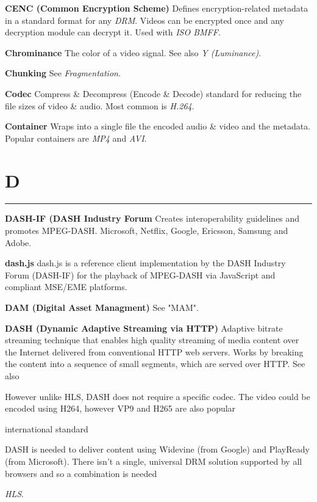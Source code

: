 \smallskip
\textbf{CENC (Common Encryption Scheme)}
Defines encryption-related metadata in a standard format for any \textit{DRM}.  Videos can be encrypted once and any decryption module can decrypt it.  Used with \textit{ISO BMFF}.

\smallskip
\textbf{Chrominance}
The color of a video signal. See also \textit{Y (Luminance)}.

\smallskip
\textbf{Chunking}
See \textit{Fragmentation}.

\smallskip
\textbf{Codec}
Compress \& Decompress (Encode \& Decode) standard for reducing the file sizes of video \& audio. Most common is \textit{H.264}.

\smallskip
\textbf{Container}
Wraps into a single file the encoded audio \& video and the metadata.  Popular containers are \textit{MP4} and \textit{AVI}.

\section{D}
\hrule

\medskip
\textbf{DASH-IF (DASH Industry Forum}
Creates interoperability guidelines and promotes MPEG-DASH. Microsoft, Netflix, Google, Ericsson, Samsung and Adobe.

\smallskip
\textbf{dash.js}
dash.js is a reference client implementation by the DASH Industry Forum (DASH-IF) for the playback of MPEG-DASH via JavaScript and compliant MSE/EME platforms.

\smallskip
\textbf{DAM (Digital Asset Managment)}
See "MAM".

\smallskip
\textbf{DASH (Dynamic Adaptive Streaming via HTTP)}
Adaptive bitrate streaming technique that enables high quality streaming of media content over the Internet delivered from conventional HTTP web servers. Works by breaking the content into a sequence of small segments, which are served over HTTP. See also

However unlike HLS, DASH does not require a specific codec. The video could be encoded using H264, however VP9 and H265 are also popular

international standard

DASH is needed to deliver content using Widevine (from Google) and PlayReady (from Microsoft). There isn’t a single, universal DRM solution supported by all browsers and so a combination is needed

\textit{HLS}.

